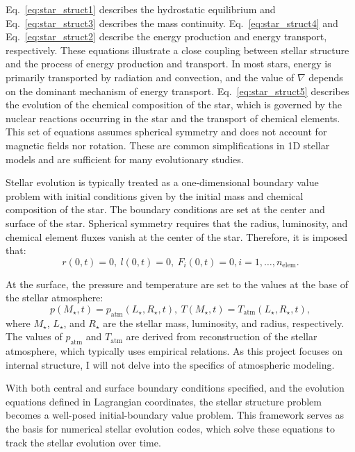 \documentclass[12pt,a4paper]{article}
\newcommand{\mr}{\mathrm}
\begin{document}
Eq.~\eqref{eq:star_struct1} describes the hydrostatic equilibrium and Eq.~\eqref{eq:star_struct3} describes the mass continuity. Eq.~\eqref{eq:star_struct4} and Eq.~\eqref{eq:star_struct2} describe the energy production and energy transport, respectively. These equations illustrate a close coupling between stellar structure and the process of energy production and transport. In most stars, energy is primarily transported by radiation and convection, and the value of $\nabla$ depends on the dominant mechanism of energy transport. Eq.~\eqref{eq:star_struct5} describes the evolution of the chemical composition of the star, which is governed by the nuclear reactions occurring in the star and the transport of chemical elements. This set of equations assumes spherical symmetry and does not account for magnetic fields nor rotation. These are common simplifications in 1D stellar models and are sufficient for many evolutionary studies.

Stellar evolution is typically treated as a one-dimensional boundary value problem with initial conditions given by the initial mass and chemical composition of the star. The boundary conditions are set at the center and surface of the star. Spherical symmetry requires that the radius, luminosity, and chemical element fluxes vanish at the center of the star. Therefore, it is imposed that:
\begin{equation}
  r(0, t) = 0,\ l(0, t) = 0,\ F_i(0, t) = 0, i = 1, \ldots, n_\mr{elem}.
\end{equation}

At the surface, the pressure and temperature are set to the values at the base of the stellar atmosphere:
\begin{equation}
  p(M_\star, t) = p_\mr{atm}(L_\star, R_\star, t),\ T(M_\star, t) = T_\mr{atm}(L_\star, R_\star, t),
\end{equation}
where $M_\star$, $L_\star$, and $R_\star$ are the stellar mass, luminosity, and radius, respectively. The values of \(p_\mr{atm}\) and \(T_\mr{atm}\) are derived from reconstruction of the stellar atmosphere, which typically uses empirical relations. As this project focuses on internal structure, I will not delve into the specifics of atmospheric modeling.

With both central and surface boundary conditions specified, and the evolution equations defined in Lagrangian coordinates, the stellar structure problem becomes a well-posed initial-boundary value problem. This framework serves as the basis for numerical stellar evolution codes, which solve these equations to track the stellar evolution over time.
\end{document}
